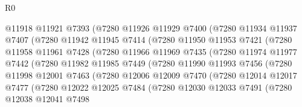 \begin{lexlean}{R0}
\begin{coremodule}
                    @11918
                    @11921
                    @7393
                    (@7280
                      @11926
                      @11929
                      @7400
                      (@7280
                        @11934
                        @11937
                        @7407
                        (@7280
                          @11942
                          @11945
                          @7414
                          (@7280
                            @11950
                            @11953
                            @7421
                            (@7280
                              @11958
                              @11961
                              @7428
                              (@7280
                                @11966
                                @11969
                                @7435
                                (@7280
                                  @11974
                                  @11977
                                  @7442
                                  (@7280
                                    @11982
                                    @11985
                                    @7449
                                    (@7280
                                      @11990
                                      @11993
                                      @7456
                                      (@7280
                                        @11998
                                        @12001
                                        @7463
                                        (@7280
                                          @12006
                                          @12009
                                          @7470
                                          (@7280
                                            @12014
                                            @12017
                                            @7477
                                            (@7280
                                              @12022
                                              @12025
                                              @7484
                                              (@7280
                                                @12030
                                                @12033
                                                @7491
                                                (@7280
                                                  @12038
                                                  @12041
                                                  @7498

\end{coremodule}
\end{lexlean}
